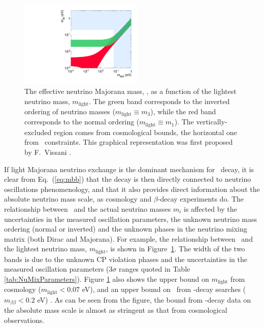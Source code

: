 \documentclass{PoS}
\begin{document}
\begin{figure}
\centering
\includegraphics[width=0.525\textwidth]{img/BetaBetaVsLight.pdf}
\caption{The effective neutrino Majorana mass, \mbb, as a function of the lightest neutrino mass, $m_\mathrm{light}$. The green band corresponds to the inverted ordering of neutrino masses ($m_\mathrm{light}\equiv m_{3}$), while the red band corresponds to the normal ordering ($m_\mathrm{light}\equiv m_{1}$). The vertically-excluded region comes from cosmological bounds, the horizontal one from \bbonu\ constraints. This graphical representation was first proposed by F.~Vissani \cite{Vissani:1999tu}.} \label{fig:BetaBetaVsLight}
\end{figure}

If light Majorana neutrino exchange is the dominant mechanism for \bbonu\ decay, it is clear from Eq.~(\ref{eq:mbb}) that the decay is then directly connected to neutrino oscillations phenomenology, and that it also provides direct information about the absolute neutrino mass scale, as cosmology and $\beta$-decay experiments do. The relationship between \mbb\ and the actual neutrino masses $m_i$ is affected by the uncertainties in the measured oscillation parameters, the unknown neutrino mass ordering (normal or inverted) and the unknown phases in the neutrino mixing matrix (both Dirac and Majorana). For example, the relationship between \mbb\ and the lightest neutrino mass, $m_\mathrm{light}$, is shown in Figure~\ref{fig:BetaBetaVsLight}. The width of the two bands is due to the unknown CP violation phases and the uncertainties in the measured oscillation parameters (3$\sigma$ ranges quoted in Table \ref{tab:NuMixParameters}). Figure \ref{fig:BetaBetaVsLight} also shows the upper bound on $m_\mathrm{light}$ from cosmology ($m_\mathrm{light}<0.07$ eV), and an upper bound on \mbb\ from \bbonu-decay searches ($m_{\beta\beta}<0.2$ eV) \cite{Albert:2014awa, Asakura:2014lma}. As can be seen from the figure, the bound from \bbonu-decay data on the absolute mass scale is almost as stringent as that from cosmological observations.
\end{document}
